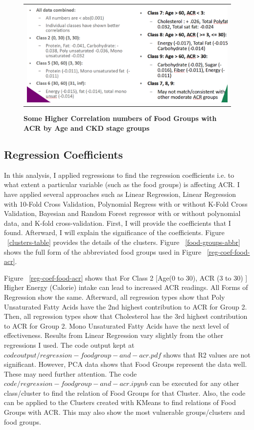 \begin{figure}
\begin{tabular}{c}
\includegraphics[scale=0.7]{images/noticeable-corr-and-food-groups.png} \\
\end{tabular}
\caption{\textbf{Some Higher Correlation numbers of Food Groups with ACR by Age and CKD stage groups}}
\label{corr-acr-food22}
\vspace{0.25cm}
\end{figure}

\subsection{Regression Coefficients}
\flushleft \justifying In this analysis, I applied regressions to find the regression coefficients i.e. to what extent a particular variable (such as the food groups) is affecting ACR. I have applied several approaches such as Linear Regression, Linear Regression with 10-Fold Cross Validation, Polynomial Regress with or without K-Fold Cross Validation, Bayesian and Random Forest regressor with or without polynomial data, and K-fold cross-validation. First, I will provide the coefficients that I found. Afterward, I will explain the significance of the coefficients. Figure ~\ref{clusters-table} provides the details of the clusters. Figure ~\ref{food-groups-abbr} shows the full form of the abbreviated food groups used in Figure ~\ref{reg-coef-food-acr}.

\flushleft \justifying Figure ~\ref{reg-coef-food-acr} shows that For Class 2 [Age(0 to 30), ACR (3 to 30) ] Higher Energy (Calorie) intake can lead to increased ACR readings. All Forms of Regression show the same. Afterward, all regression types show that Poly Unsaturated Fatty Acids have the 2nd highest contribution to ACR for Group 2. Then, all regression types show that Cholesterol has the 3rd highest contribution to ACR for Group 2. Mono Unsaturated Fatty Acids have the next level of effectiveness. Results from Linear Regression vary slightly from the other regressions I used. The code output kept at $codeoutput/regression-foodgroup-and-acr.pdf$ shows that R2 values are not significant. However, PCA data shows that Food Groups represent the data well. These may need further attention. The code $code/regression-foodgroup-and-acr.ipynb$ can be executed for any other class/cluster to find the relation of Food Groups for that Cluster. Also, the code can be applied to the Clusters created with KMeans to find relations of Food Groups with ACR. This may also show the most vulnerable groups/clusters and food groups.


